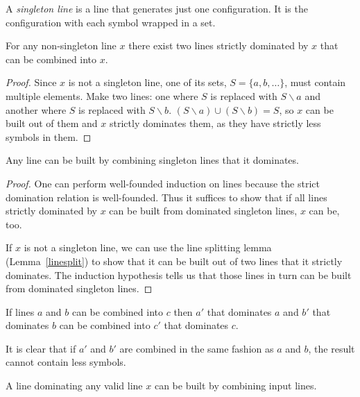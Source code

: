 \documentclass[english, 12pt, a4paper, sci, a-1b, online]{aaltothesis}
\begin{document}
A \emph{singleton line} is a line that generates just one configuration. It is the configuration with each symbol wrapped in a set.

\begin{lemma}\label{linesplit}
For any non-singleton line $x$ there exist two lines strictly dominated by $x$ that can be combined into $x$.
\end{lemma}

\begin{proof}
Since $x$ is not a singleton line, one of its sets, $S = \{a, b, \dots\}$, must contain multiple elements. Make two lines: one where $S$ is replaced with $S \smallsetminus a$ and another where $S$ is replaced with $S \smallsetminus b$. $(S \smallsetminus a) \cup (S \smallsetminus b) = S$, so $x$ can be built out of them and $x$ strictly dominates them, as they have strictly less symbols in them.
\end{proof}

\begin{theorem}\label{explode}
Any line can be built by combining singleton lines that it dominates.
\end{theorem}

\begin{proof}
One can perform well-founded induction on lines because the strict domination relation is well-founded. Thus it suffices to show that if all lines strictly dominated by $x$ can be built from dominated singleton lines, $x$ can be, too.

If $x$ is not a singleton line, we can use the line splitting lemma (Lemma~\ref{linesplit}) to show that it can be built out of two lines that it strictly dominates. The induction hypothesis tells us that those lines in turn can be built from dominated singleton lines.
\end{proof}

\begin{lemma}\label{biggood}
If lines $a$ and $b$ can be combined into $c$ then $a'$ that dominates $a$ and $b'$ that dominates $b$ can be combined into $c'$ that dominates $c$.
\end{lemma}

It is clear that if $a'$ and $b'$ are combined in the same fashion as $a$ and $b$, the result cannot contain less symbols.

\begin{theorem}\label{complete}
A line dominating any valid line $x$ can be built by combining input lines.
\end{theorem}
\end{document}
